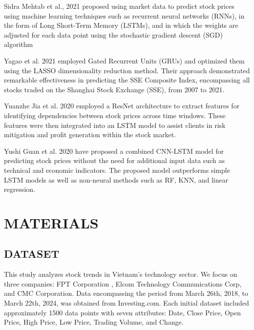 \documentclass[conference]{IEEEtran}
\begin{document}
Sidra Mehtab et al., 2021 \cite{lstm}  proposed using market data to predict stock prices using machine learning techniques such as recurrent neural networks (RNNs), in the form of Long Short-Term Memory (LSTMs), and in which the weights are adjusted for each data point using the stochastic gradient descent (SGD) algorithm

Yagao et al. 2021 \cite{gru} employed Gated Recurrent Units (GRUs) and optimized them using the LASSO dimensionality reduction method. Their approach demonstrated remarkable effectiveness in predicting the SSE Composite Index, encompassing all stocks traded on the Shanghai Stock Exchange (SSE), from 2007 to 2021.

Yuanzhe Jia et al. 2020 \cite{resnet} employed a ResNet architecture to extract features for identifying dependencies between stock prices across time windows. These features were then integrated into an LSTM model to assist clients in risk mitigation and profit generation within the stock market.

Yushi Guan et al. 2020 \cite{cnnlstm} have proposed a combined CNN-LSTM model for predicting stock prices without the need for additional input data such as technical and economic indicators. The proposed model outperforms simple LSTM models as well as non-neural methods such as RF, KNN, and linear regression.

\section{MATERIALS}
\subsection{DATASET}

This study analyzes stock trends in Vietnam's technology sector. We focus on three companies: FPT Corporation   , Elcom Technology Communications Corp, and CMC Corporation. Data encompassing the period from March 26th, 2018, to March 22th, 2024, was obtained from Investing.com. Each initial dataset included approximately 1500 data points with seven attributes: Date, Close Price, Open Price, High Price, Low Price, Trading Volume, and Change. 
\end{document}
